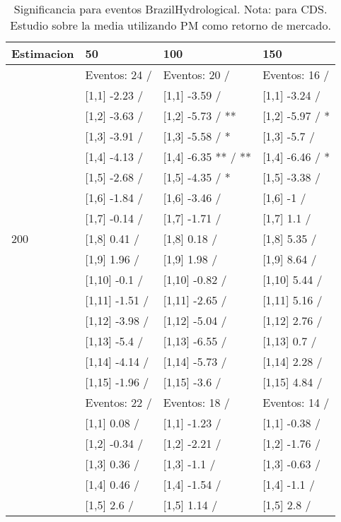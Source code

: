 \begin{table}

\caption{Significancia para eventos BrazilHydrological. Nota: para CDS. Estudio sobre la media utilizando PM como retorno de mercado.}
\centering
\begin{tabular}[t]{llll}
\toprule
Estimacion & 50 & 100 & 150\\
\midrule
 & Eventos:  24 / & Eventos:  20 / & Eventos:  16 /\\
 & {}[1,1] -2.23  / & {}[1,1] -3.59  / & {}[1,1] -3.24  /\\
 & {}[1,2] -3.63  / & {}[1,2] -5.73  / ** & {}[1,2] -5.97  / *\\
 & {}[1,3] -3.91  / & {}[1,3] -5.58  / * & {}[1,3] -5.7  /\\
 & {}[1,4] -4.13  / & {}[1,4] -6.35 ** / ** & {}[1,4] -6.46  / *\\
\addlinespace
 & {}[1,5] -2.68  / & {}[1,5] -4.35  / * & {}[1,5] -3.38  /\\
 & {}[1,6] -1.84  / & {}[1,6] -3.46  / & {}[1,6] -1  /\\
 & {}[1,7] -0.14  / & {}[1,7] -1.71  / & {}[1,7] 1.1  /\\
200 & {}[1,8] 0.41  / & {}[1,8] 0.18  / & {}[1,8] 5.35  /\\
 & {}[1,9] 1.96  / & {}[1,9] 1.98  / & {}[1,9] 8.64  /\\
\addlinespace
 & {}[1,10] -0.1  / & {}[1,10] -0.82  / & {}[1,10] 5.44  /\\
 & {}[1,11] -1.51  / & {}[1,11] -2.65  / & {}[1,11] 5.16  /\\
 & {}[1,12] -3.98  / & {}[1,12] -5.04  / & {}[1,12] 2.76  /\\
 & {}[1,13] -5.4  / & {}[1,13] -6.55  / & {}[1,13] 0.7  /\\
 & {}[1,14] -4.14  / & {}[1,14] -5.73  / & {}[1,14] 2.28  /\\
\addlinespace
 & {}[1,15] -1.96  / & {}[1,15] -3.6  / & {}[1,15] 4.84  /\\
 & Eventos:  22 / & Eventos:  18 / & Eventos:  14 /\\
 & {}[1,1] 0.08  / & {}[1,1] -1.23  / & {}[1,1] -0.38  /\\
 & {}[1,2] -0.34  / & {}[1,2] -2.21  / & {}[1,2] -1.76  /\\
 & {}[1,3] 0.36  / & {}[1,3] -1.1  / & {}[1,3] -0.63  /\\
\addlinespace
 & {}[1,4] 0.46  / & {}[1,4] -1.54  / & {}[1,4] -1.1  /\\
 & {}[1,5] 2.6  / & {}[1,5] 1.14  / & {}[1,5] 2.8  /\\

\end{tabular}
\end{table}
